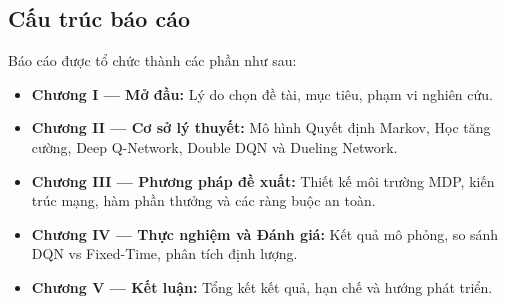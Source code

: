 \subsection{Cấu trúc báo cáo}

Báo cáo được tổ chức thành các phần như sau:

\begin{itemize}
    \item \textbf{Chương I --- Mở đầu:} Lý do chọn đề tài, mục tiêu, phạm vi nghiên cứu.
    \item \textbf{Chương II --- Cơ sở lý thuyết:} Mô hình Quyết định Markov, Học tăng cường, Deep Q-Network, Double DQN và Dueling Network.
    \item \textbf{Chương III --- Phương pháp đề xuất:} Thiết kế môi trường MDP, kiến trúc mạng, hàm phần thưởng và các ràng buộc an toàn.
    \item \textbf{Chương IV --- Thực nghiệm và Đánh giá:} Kết quả mô phỏng, so sánh DQN vs Fixed-Time, phân tích định lượng.
    \item \textbf{Chương V --- Kết luận:} Tổng kết kết quả, hạn chế và hướng phát triển.
\end{itemize}
